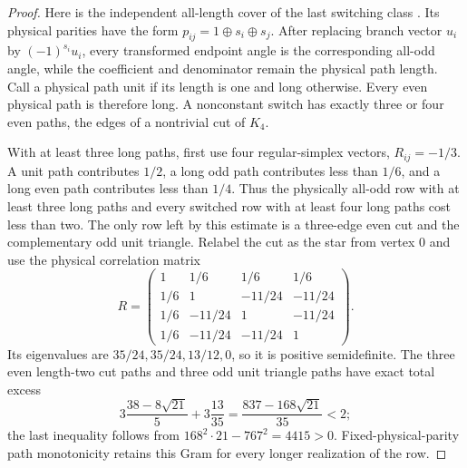 \documentclass[11pt]{article}
\theoremstyle{remark}
\begin{document}
\begin{proof}
Here is the independent all-length cover of the last switching class
\cite{K4Cover}.  Its physical parities have the form
$p_{ij}=1\mathbin\oplus s_i\mathbin\oplus s_j$.  After replacing branch vector
$u_i$ by $(-1)^{s_i}u_i$, every transformed endpoint angle is the corresponding
all-odd angle, while the coefficient and denominator remain the physical path
length.  Call a physical path unit if its length is one and long otherwise.
Every even physical path is therefore long.  A nonconstant switch has exactly
three or four even paths, the edges of a nontrivial cut of $K_4$.

With at least three long paths, first use four regular-simplex vectors,
$R_{ij}=-1/3$.  A unit path contributes $1/2$, a long odd path contributes
less than $1/6$, and a long even path contributes less than $1/4$.  Thus the
physically all-odd row with at least three long paths and every switched row
with at least four long paths cost less than two.  The only row left by this
estimate is a three-edge even cut and the complementary odd unit triangle.
Relabel the cut as the star from vertex $0$ and use the physical correlation
matrix
\[
 R=\begin{pmatrix}
 1&1/6&1/6&1/6\\
 1/6&1&-11/24&-11/24\\
 1/6&-11/24&1&-11/24\\
 1/6&-11/24&-11/24&1
 \end{pmatrix}.
\]
Its eigenvalues are $35/24,35/24,13/12,0$, so it is positive semidefinite.
The three even length-two cut paths and three odd unit triangle paths have
exact total excess
\[
 3\frac{38-8\sqrt{21}}5+3\frac{13}{35}
 =\frac{837-168\sqrt{21}}{35}<2;
\]
the last inequality follows from
$168^2\cdot21-767^2=4415>0$.  Fixed-physical-parity path monotonicity retains
this Gram for every longer realization of the row.


\end{proof}
\end{document}
